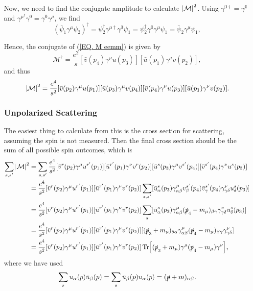 \documentclass[11pt]{article}
\theoremstyle{definition}
\begin{document}
Now, we need to find the conjugate amplitude to calculate $\abs{\mathcal{M}}^2$. Using $\gamma^{0\dagger} = \gamma^0$ and $\gamma^{\mu^\dagger}\gamma^0 = \gamma^0 \gamma^\mu$, we find
\begin{equation}
    (\bar{\psi}_1\gamma^\mu\psi_2)^\dagger = \psi_2^\dagger\gamma^{\mu\dagger}\gamma^0\psi_1 = \psi_2^\dagger\gamma^0\gamma^{\mu}\psi_1 = \bar{\psi}_2 \gamma^\mu \psi_1,
\end{equation}

Hence, the conjugate of (\ref{EQ. M eemm}) is given by
\begin{equation}
    \mathcal{M}^\dagger = \frac{e^2}{s}[\bar{v}(p_4)\gamma^\mu u(p_3)][\bar{u}(p_1)\gamma^\mu v(p_2)],
\end{equation}
and thus
\begin{equation}
    \abs{\mathcal{M}}^2 = \frac{e^4}{s^2}[\bar{v}(p_2)\gamma^\mu u(p_1)][\bar{u}(p_3)\gamma^\mu v(p_4)][\bar{v}(p_4)\gamma^\nu u(p_3)][\bar{u}(p_1)\gamma^\nu v(p_2)].
\end{equation}

\subsubsection{Unpolarized Scattering}
The easiest thing to calculate from this is the cross section for scattering, assuming the spin is not measured. Then the final cross section should be the sum of all possible spin outcomes, which is
\begin{equation}
\begin{aligned}
        \sum_{s,s'}\abs{\mathcal{M}}^2 &= \sum_{s,s'}\frac{e^4}{s^2}[\bar{v}^r(p_2)\gamma^\mu u^{r'}(p_1)][\bar{u}^{r'}(p_1)\gamma^\nu v^r(p_2)][\bar{u}^s(p_3)\gamma^\mu v^{s'}(p_4)][\bar{v}^{s'}(p_4)\gamma^\nu u^s(p_3)] \\
        &= \frac{e^4}{s^2}[\bar{v}^r(p_2)\gamma^\mu u^{r'}(p_1)][\bar{u}^{r'}(p_1)\gamma^\nu v^r(p_2)]\sum_{s,s'}[\bar{u}_\alpha^s(p_3)\gamma^\mu_{\alpha\beta} v^{s'}_\beta(p_4)\bar{v}_\gamma^{s'}(p_4)\gamma^\nu_{\gamma\delta} u^s_\delta(p_3)] \\
        &= \frac{e^4}{s^2}[\bar{v}^r(p_2)\gamma^\mu u^{r'}(p_1)][\bar{u}^{r'}(p_1)\gamma^\nu v^r(p_2)]\sum_{s}[\bar{u}_\alpha^s(p_3)\gamma^\mu_{\alpha\beta} (\slashed{p}_4-m_\mu)_{\beta\gamma}\gamma^\nu_{\gamma\delta} u^s_\delta(p_3)] \\
        &= \frac{e^4}{s^2}[\bar{v}^r(p_2)\gamma^\mu u^{r'}(p_1)][\bar{u}^{r'}(p_1)\gamma^\nu v^r(p_2)][(\slashed{p}_3+m_\mu)_{\delta\alpha}\gamma^\mu_{\alpha\beta} (\slashed{p}_4-m_\mu)_{\beta\gamma}\gamma^\nu_{\gamma\delta}] \\
        &= \frac{e^4}{s^2}[\bar{v}^r(p_2)\gamma^\mu u^{r'}(p_1)][\bar{u}^{r'}(p_1)\gamma^\nu v^r(p_2)]\Tr[(\slashed{p}_3+m_\mu)\gamma^\mu (\slashed{p}_4-m_\mu)\gamma^\nu],
\end{aligned}
\end{equation}
where we have used
\begin{equation}
    \sum_s u_\alpha(p)\bar{u}_\beta(p) = \sum_s \bar{u}_\beta(p)u_\alpha(p) = (\slashed{p}+m)_{\alpha\beta}.
\end{equation}
\end{document}
